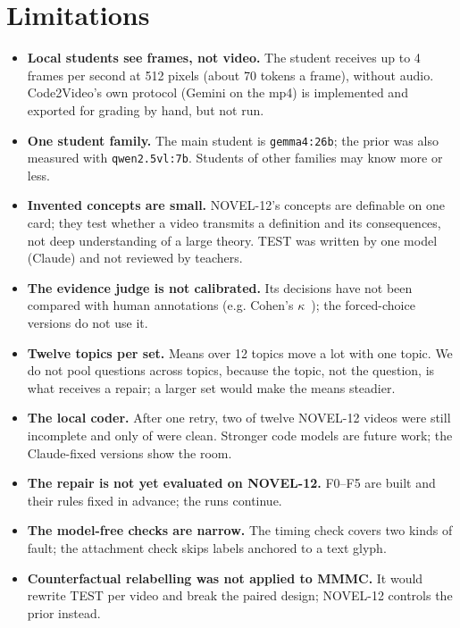 \section{Limitations}

\begin{itemize}
  \item \textbf{Local students see frames, not video.} The student receives up to 4 frames per second at 512 pixels
  (about 70 tokens a frame), without audio. Code2Video's own protocol (Gemini on the mp4) is implemented and exported
  for grading by hand, but not run.
  \item \textbf{One student family.} The main student is \texttt{gemma4:26b}; the prior was also measured with
  \texttt{qwen2.5vl:7b}. Students of other families may know more or less.
  \item \textbf{Invented concepts are small.} NOVEL-12's concepts are definable on one card; they test whether a video
  transmits a definition and its consequences, not deep understanding of a large theory. TEST was written by one model
  (Claude) and not reviewed by teachers.
  \item \textbf{The evidence judge is not calibrated.} Its decisions have not been compared with human annotations
  (e.g. Cohen's $\kappa$~\cite{cohen1960}); the forced-choice versions do not use it.
  \item \textbf{Twelve topics per set.} Means over 12 topics move a lot with one topic. We do not pool questions
  across topics, because the topic, not the question, is what receives a repair; a larger set would make the means
  steadier.
  \item \textbf{The local coder.} After one retry, two of twelve NOVEL-12 videos were still incomplete and only
  \AdmClean{} of \AdmTotal{} were clean. Stronger code models are future work; the Claude-fixed versions show the
  room.
  \item \textbf{The repair is not yet evaluated on NOVEL-12.} F0--F5 are built and their rules fixed in advance; the runs continue.
  \item \textbf{The model-free checks are narrow.} The timing check covers two kinds of fault; the attachment check
  skips labels anchored to a text glyph.
  \item \textbf{Counterfactual relabelling was not applied to MMMC.} It would rewrite TEST per video and break the
  paired design; NOVEL-12 controls the prior instead.
\end{itemize}

